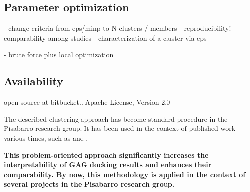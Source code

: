 \subsection{Parameter optimization}


        - change criteria from eps/minp to N clusters / members
        - reproducibility!
        - comparability among studies
        - characterization of a cluster via eps

        - brute force plus local optimization



\subsection{Availability}

            open source at bitbucket..
Apache License, Version 2.0


The described clustering approach has become standard procedure in the Pisabarro
research group. It has been used in the context of published work various times,
such as \cite{franz_cathepsin_2013} and \cite{dmd_samsonov_gehrcke_2014}.


\textbf{
This problem-oriented approach significantly increases the
interpretability of GAG docking results and enhances their comparability. By
now, this methodology is applied in the context of several projects in the
Pisabarro research group.
}



